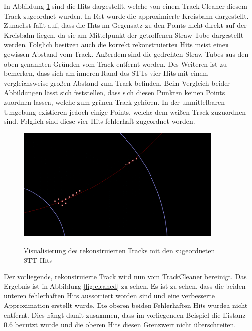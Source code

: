 In Abbildung \ref{fig:hits} sind die Hits dargestellt, welche von einem Track-Cleaner diesem Track zugeordnet wurden. In Rot wurde die approximierte Kreisbahn dargestellt. Zunächst fällt auf, dass die Hits im Gegensatz zu den Points nicht direkt auf der Kreisbahn liegen, da sie am Mittelpunkt der getroffenen Straw-Tube dargestellt werden. Folglich besitzen auch die korrekt rekonstruierten Hits meist einen gewissen Abstand vom Track. Außerdem sind die gedrehten Straw-Tubes aus den oben genannten Gründen vom Track entfernt worden. Des Weiteren ist zu bemerken, dass sich am inneren Rand des STTs vier Hits mit einem vergleichsweise großen Abstand zum Track befinden. Beim Vergleich beider Abbildungen lässt sich feststellen, dass sich diesen Punkten keinen Points zuordnen lassen, welche zum grünen Track gehören. In der unmittelbaren Umgebung existieren jedoch einige Points, welche dem weißen Track zuzuordnen sind. Folglich sind diese vier Hits fehlerhaft zugeordnet worden.

\begin{figure}
  \includegraphics[width=0.9\textwidth]{Bilder/HitsApprox}
	\label{fig:hits}
	\caption{Visualisierung des rekonstruierten Tracks mit den zugeordneten STT-Hits}
\end{figure}

Der vorliegende, rekonstruierte Track wird nun vom TrackCleaner bereinigt. Das Ergebnis ist in Abbildung \ref{fig:cleaned} zu sehen. Es ist zu sehen, dass die beiden unteren fehlerhaften Hits aussortiert worden sind und eine verbesserte Approximation erstellt wurde. Die oberen beiden Fehlerhaften Hits wurden nicht entfernt. Dies hängt damit zusammen, dass im vorliegenden Beispiel die Distanz 0.6 benutzt wurde und die oberen Hits diesen Grenzwert nicht überschreiten.

